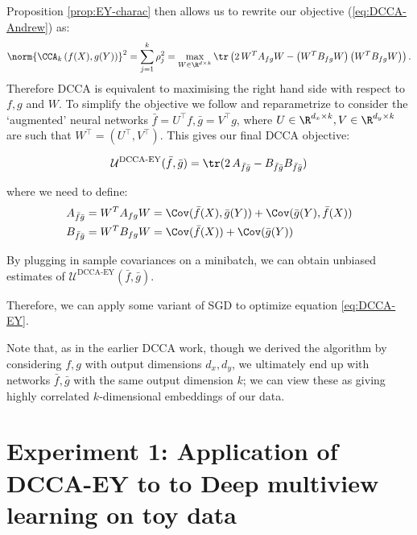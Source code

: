 Proposition \ref{prop:EY-charac} then allows us to rewrite our objective (\ref{eq:DCCA-Andrew}) as:
\begin{align*}
    \norm{\CCA_k\left(f(X),g(Y)\right)}^2 
    = \sum_{j=1}^k \rho_j^2 
    = \max_{W \in \R^{d \times k}} \tr \left( 2\, W^T A_{fg} W - \left(W^T B_{fg} W\right) \left(W^T B_{fg} W\right) \right).
\end{align*}
Therefore DCCA is equivalent to maximising the right hand side with respect to $f,g$ and $W$. To simplify the objective we follow \cite{wang2015stochastic} and reparametrize to consider the `augmented' neural networks $\bar{f} = U^{\top} f, \bar{g} = V^{\top} g$, where $U\in \R^{d_x \times k}, V\in \R^{d_y \times k}$ are such that $W^{\top} = (U^{\top}, V^{\top})$. This gives our final DCCA objective:

\begin{align}\label{eq:DCCA-EY}
    \mathcal{U}^\text{DCCA-EY}(\bar{f},\bar{g}) = \tr(2 \, A_{\bar{f}\bar{g}} - B_{\bar{f}\bar{g}} B_{\bar{f}\bar{g}})
\end{align}

where we need to define:
\begin{align*}
    A_{\bar{f}\bar{g}}
    &= W^T A_{fg} W 
    = \Cov(\bar{f}(X),\bar{g}(Y)) + \Cov(\bar{g}(Y),\bar{f}(X)) \\
    B_{\bar{f}\bar{g}} 
    &= W^T B_{fg} W 
    = \Cov(\bar{f}(X)) + \Cov(\bar{g}(Y))
\end{align*}


By plugging in sample covariances on a minibatch, we can obtain unbiased estimates of $\mathcal{U}^\text{DCCA-EY}(\bar{f},\bar{g})$.

Therefore, we can apply some variant of SGD to optimize equation \ref{eq:DCCA-EY}.

Note that, as in the earlier DCCA work, though we derived the algorithm by considering $f,g$ with output dimensions $d_x,d_y$, we ultimately end up with networks $\bar{f},\bar{g}$ with the same output dimension $k$; we can view these as giving highly correlated $k$-dimensional embeddings of our data.



\section{Experiment 1: Application of DCCA-EY to to Deep multiview learning on toy data}

